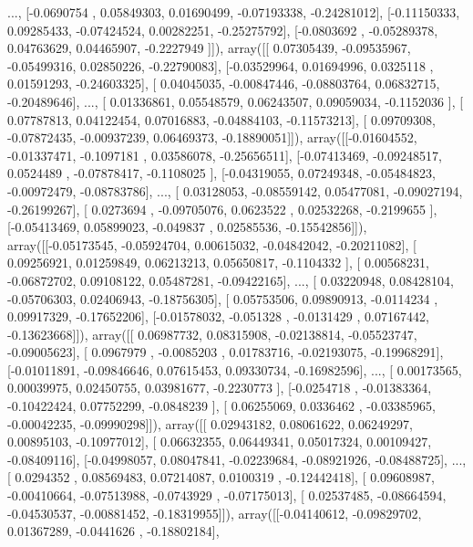 \documentclass{article}
\begin{document}
       ..., 
       [-0.0690754 ,  0.05849303,  0.01690499, -0.07193338, -0.24281012],
       [-0.11150333,  0.09285433, -0.07424524,  0.00282251, -0.25275792],
       [-0.0803692 , -0.05289378,  0.04763629,  0.04465907, -0.2227949 ]]), array([[ 0.07305439, -0.09535967, -0.05499316,  0.02850226, -0.22790083],
       [-0.03529964,  0.01694996,  0.0325118 ,  0.01591293, -0.24603325],
       [ 0.04045035, -0.00847446, -0.08803764,  0.06832715, -0.20489646],
       ..., 
       [ 0.01336861,  0.05548579,  0.06243507,  0.09059034, -0.1152036 ],
       [ 0.07787813,  0.04122454,  0.07016883, -0.04884103, -0.11573213],
       [ 0.09709308, -0.07872435, -0.00937239,  0.06469373, -0.18890051]]), array([[-0.01604552, -0.01337471, -0.1097181 ,  0.03586078, -0.25656511],
       [-0.07413469, -0.09248517,  0.0524489 , -0.07878417, -0.1108025 ],
       [-0.04319055,  0.07249348, -0.05484823, -0.00972479, -0.08783786],
       ..., 
       [ 0.03128053, -0.08559142,  0.05477081, -0.09027194, -0.26199267],
       [ 0.0273694 , -0.09705076,  0.0623522 ,  0.02532268, -0.2199655 ],
       [-0.05413469,  0.05899023, -0.049837  ,  0.02585536, -0.15542856]]), array([[-0.05173545, -0.05924704,  0.00615032, -0.04842042, -0.20211082],
       [ 0.09256921,  0.01259849,  0.06213213,  0.05650817, -0.1104332 ],
       [ 0.00568231, -0.06872702,  0.09108122,  0.05487281, -0.09422165],
       ..., 
       [ 0.03220948,  0.08428104, -0.05706303,  0.02406943, -0.18756305],
       [ 0.05753506,  0.09890913, -0.0114234 ,  0.09917329, -0.17652206],
       [-0.01578032, -0.051328  , -0.0131429 ,  0.07167442, -0.13623668]]), array([[ 0.06987732,  0.08315908, -0.02138814, -0.05523747, -0.09005623],
       [ 0.0967979 , -0.0085203 ,  0.01783716, -0.02193075, -0.19968291],
       [-0.01011891, -0.09846646,  0.07615453,  0.09330734, -0.16982596],
       ..., 
       [ 0.00173565,  0.00039975,  0.02450755,  0.03981677, -0.2230773 ],
       [-0.0254718 , -0.01383364, -0.10422424,  0.07752299, -0.0848239 ],
       [ 0.06255069,  0.0336462 , -0.03385965, -0.00042235, -0.09990298]]), array([[ 0.02943182,  0.08061622,  0.06249297,  0.00895103, -0.10977012],
       [ 0.06632355,  0.06449341,  0.05017324,  0.00109427, -0.08409116],
       [-0.04998057,  0.08047841, -0.02239684, -0.08921926, -0.08488725],
       ..., 
       [ 0.0294352 ,  0.08569483,  0.07214087,  0.0100319 , -0.12442418],
       [ 0.09608987, -0.00410664, -0.07513988, -0.0743929 , -0.07175013],
       [ 0.02537485, -0.08664594, -0.04530537, -0.00881452, -0.18319955]]), array([[-0.04140612, -0.09829702,  0.01367289, -0.0441626 , -0.18802184],
\end{document}
